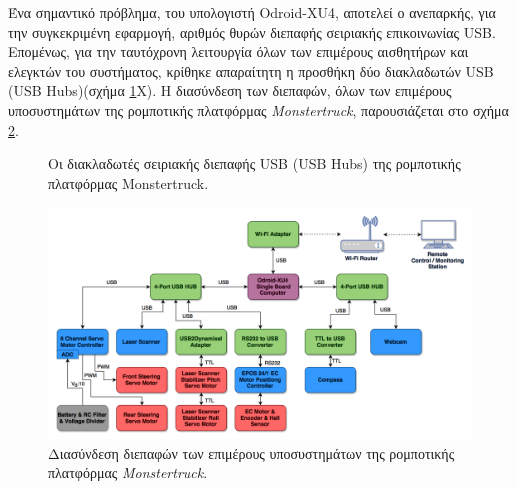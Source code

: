 \bigskip
Ένα σημαντικό πρόβλημα, του υπολογιστή {Odroid-XU4}, αποτελεί ο ανεπαρκής, για την συγκεκριμένη εφαρμογή, αριθμός θυρών διεπαφής σειριακής επικοινωνίας USB. Επομένως, για την ταυτόχρονη λειτουργία όλων των επιμέρους αισθητήρων και ελεγκτών του συστήματος, κρίθηκε απαραίτητη η προσθήκη δύο {διακλαδωτών USB (USB Hubs)}(σχήμα \ref{fig:usb_hubs}X). Η διασύνδεση των διεπαφών, όλων των επιμέρους υποσυστημάτων της ρομποτικής πλατφόρμας \textit{Monstertruck}, παρουσιάζεται στο σχήμα \ref{fig:hardware_interface_diagram}.

\begin{figure}[!ht]
	\centering
	\caption{Οι διακλαδωτές σειριακής διεπαφής USB (USB Hubs) της ρομποτικής  πλατφόρμας Monstertruck.}
	\label{fig:usb_hubs}
\end{figure}


\begin{figure}[!ht]
	\centering
	\includegraphics[width=1\linewidth]{Chapters/Chapter2/Figures/hardware_interface_diagram.png}
	\caption{Διασύνδεση διεπαφών των επιμέρους υποσυστημάτων της ρομποτικής πλατφόρμας \textit{Monstertruck}.}
	\label{fig:hardware_interface_diagram}
\end{figure}


